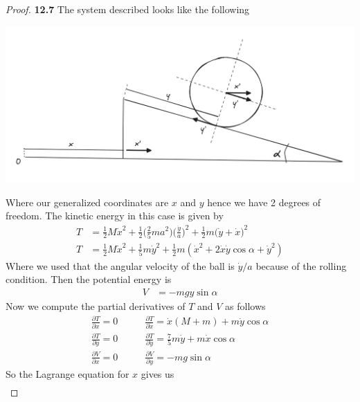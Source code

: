 \documentclass[11pt]{article}
\theoremstyle{definition}
\begin{document}
\begin{proof}{\textbf{12.7}}
    The system described looks like the following
    \begin{center}
        \includegraphics[scale=0.4]{ch12-7.png}
    \end{center}
    Where our generalized coordinates are $x$ and $y$ hence we have 2 degrees
    of freedom. The kinetic energy in this case is given by
    \begin{align*}
        T &= \frac{1}{2}M \dot x^2
        + \frac{1}{2}\bigg(\frac{2}{5}ma^2\bigg) \bigg(\frac{\dot{y}}{a}\bigg)^2
        + \frac{1}{2}m\bigg(\dot y + \dot x\bigg)^2\\
        T &= \frac{1}{2}M\dot{x}^2 + \frac{1}{5}m\dot y^2
        + \frac{1}{2}m(\dot x^2 + 2\dot x\dot y\cos\alpha + \dot y^2)
    \end{align*}
    Where we used that the angular velocity of the ball is $\dot{y}/a$ because
    of the rolling condition. Then the potential energy is
    \begin{align*}
        V &= - mgy\sin\alpha
    \end{align*}
    Now we compute the partial derivatives of $T$ and $V$ as follows
    \begin{align*}
        \frac{\partial T}{\partial x} = 0 \quad\quad&
        \frac{\partial T}{\partial \dot x} = \dot x (M + m) + m\dot y\cos\alpha\\
        \frac{\partial T}{\partial y} = 0 \quad\quad&
        \frac{\partial T}{\partial \dot y} =
        \frac{7}{5}m\dot{y} + m\dot x\cos\alpha\\
        \frac{\partial V}{\partial x} = 0 \quad\quad&
        \frac{\partial V}{\partial y} = -mg\sin\alpha
    \end{align*}
    So the Lagrange equation for $x$ gives us
    \begin{align*}

\end{align*}
\end{proof}
\end{document}
